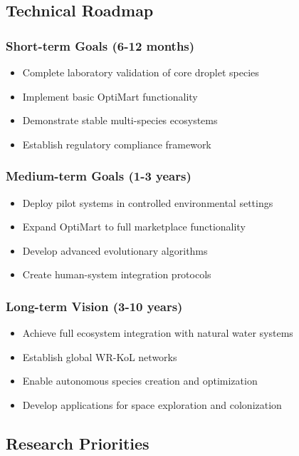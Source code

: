 \documentclass[11pt,a4paper]{article}
\begin{document}
\subsection{Technical Roadmap}

\subsubsection{Short-term Goals (6-12 months)}
\begin{itemize}
    \item Complete laboratory validation of core droplet species
    \item Implement basic OptiMart functionality
    \item Demonstrate stable multi-species ecosystems
    \item Establish regulatory compliance framework
\end{itemize}

\subsubsection{Medium-term Goals (1-3 years)}
\begin{itemize}
    \item Deploy pilot systems in controlled environmental settings
    \item Expand OptiMart to full marketplace functionality
    \item Develop advanced evolutionary algorithms
    \item Create human-system integration protocols
\end{itemize}

\subsubsection{Long-term Vision (3-10 years)}
\begin{itemize}
    \item Achieve full ecosystem integration with natural water systems
    \item Establish global WR-KoL networks
    \item Enable autonomous species creation and optimization
    \item Develop applications for space exploration and colonization
\end{itemize}

\subsection{Research Priorities}
\end{document}
